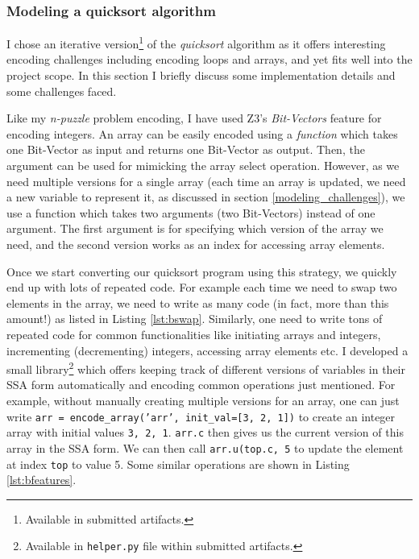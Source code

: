 \documentclass{sig-alternate-05-2015}
\begin{document}
\subsubsection{Modeling a {\subsecit quicksort} algorithm}

I chose an iterative version\footnote{Available in submitted artifacts.} of the 
\textit{quicksort} algorithm as it offers interesting encoding challenges 
including encoding loops and arrays, and yet fits well into the project scope. In this 
section I briefly discuss some implementation details and some challenges faced.

Like my \textit{n-puzzle} problem encoding, I have used Z3's \textit{Bit-Vectors} feature 
for encoding integers. An array can be easily encoded using a \textit{function} which takes 
one Bit-Vector as input and returns one Bit-Vector as output. Then, the argument can be used 
for mimicking the array select operation. However, as we need multiple 
versions for a single array (each time an array is updated, we need a new variable to represent
it, as discussed in section \ref{modeling_challenges}), we use a function 
which takes two arguments (two Bit-Vectors) instead of one argument. The first argument 
is for specifying which version of the array we need, and the second version works as 
an index for accessing array elements. 

Once we start converting our quicksort program using this strategy, we quickly end up with 
lots of repeated code. For example each time we need to swap two elements in the array, we 
need to write as many code (in fact, more than this amount!) as listed in Listing \ref{lst:bswap}. 
Similarly, one need to write tons of repeated code for common functionalities like initiating 
arrays and integers, incrementing (decrementing) integers, accessing array elements etc. I 
developed a small library\footnote{Available in \texttt{helper.py} file within submitted artifacts.} which 
offers keeping track of different versions of variables in their SSA form automatically and 
encoding common operations 
just mentioned. For example, without manually creating multiple versions for an array, one can just 
write \texttt{arr = encode\_array('arr', init\_val=[3, 2, 1])} to create an integer array with 
initial values \texttt{{3, 2, 1}}. \texttt{arr.c} then gives us the current version of this array 
in the SSA form. We can then call \texttt{arr.u(top.c, 5} to update the element at index 
\texttt{top} to value 5. Some similar operations are shown in Listing \ref{lst:bfeatures}.
\end{document}
